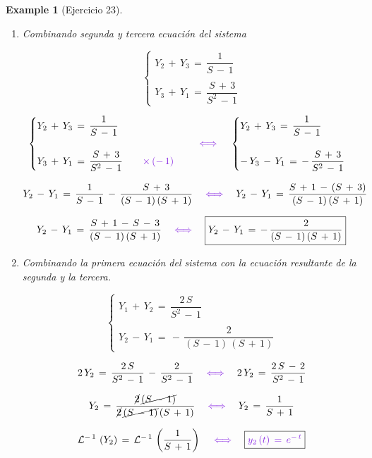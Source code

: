 \documentclass[a4paper,11pt,openany]{book}
\newtheorem{exmp}{Example}[section]
\newcommand*{\itembolasazules}[1]{%
\footnotesize\protect\tikz[baseline=-3pt]%
\protect\node[scale=.7, circle, shade, ball
color=green]{\color{white}\Large\bf#1};}
\begin{document}
\begin{exmp}[Ejercicio 23]
\begin{enumerate}[label=\itembolasazules{\arabic*}]
\item Combinando segunda y tercera ecuación del sistema
 
$$\begin{cases}
Y_{2}\,+\,Y_{3}\,=\,\dfrac{1}{S\,-\,1} \\
\\
Y_{3}\,+\,Y_{1}\,=\,\dfrac{S\,+\,3}{S^{2}\,-\,1}
\end{cases}$$
 
$$\begin{cases}
Y_{2}\,+\,Y_{3}\,=\,\dfrac{1}{S\,-\,1} \\
\\
Y_{3}\,+\,Y_{1}\,=\,\dfrac{S\,+\,3}{S^{2}\,-\,1} \qquad \textcolor{blue-violet}{\times\,(-\,1)}
\end{cases} \quad \textcolor{blue-violet}{\iff} \quad \begin{cases}
Y_{2}\,+\,Y_{3}\,=\,\dfrac{1}{S\,-\,1} \\
\\
-\,Y_{3}\,-\,Y_{1}\,=\,-\,\dfrac{S\,+\,3}{S^{2}\,-\,1} 
\end{cases}$$
 
$$Y_{2}\,-\,Y_{1}\,=\,\dfrac{1}{S\,-\,1}\,-\,\dfrac{S\,+\,3}{(S\,-\,1)\,(S\,+\,1)} \quad \textcolor{blue-violet}{\iff} \quad Y_{2}\,-\,Y_{1}\,=\,\dfrac{S\,+\,1\,-\,(S\,+\,3)}{(S\,-\,1)\,(S\,+\,1)}$$
 
$$Y_{2}\,-\,Y_{1}\,=\,\dfrac{S\,+\,1\,-\,S\,-\,3}{(S\,-\,1)\,(S\,+\,1)} \quad \textcolor{blue-violet}{\iff} \quad \boxed{Y_{2}\,-\,Y_{1}\,=\,-\,\dfrac{2}{(S\,-\,1)\,(S\,+\,1)} }$$
 
\item Combinando la primera ecuación del sistema con la ecuación resultante de la segunda y la tercera. 
 
$$\begin{cases}
Y_{1}\,+\,Y_{2}\,=\,\dfrac{2\,S}{S^{2}\,-\,1}\\
\\
Y_{2}\,-\,Y_{1}\,=\,-\,\dfrac{2}{(S\,-\,1)\,(S\,+\,1)}
\end{cases}$$
 
$$2\,Y_{2}\,=\,\dfrac{2\,S}{S^{2}\,-\,1}\,-\,\dfrac{2}{S^{2}\,-\,1} \quad \textcolor{blue-violet}{\iff} \quad 2\,Y_{2}\,=\,\dfrac{2\,S\,-\,2}{S^{2}\,-\,1}$$
 
$$Y_{2}\,=\,\dfrac{\cancel{2}\,\cancel{(S\,-\,1)}}{\cancel{2}\,\cancel{(S\,-\,1)}\,(S\,+\,1)} \quad \textcolor{blue-violet}{\iff} \quad Y_{2}\,=\,\dfrac{1}{S\,+\,1}$$
 
$$\mathcal{L}^{-\,1}\,\left(Y_{2} \right)\,=\,\mathcal{L}^{-\,1}\,\left(\dfrac{1}{S\,+\,1} \right) \quad \textcolor{blue-violet}{\iff} \quad \boxed{\textcolor{blue-violet}{y_{2}\,(t)\,=\,e^{-\,t} } }$$
 

\end{enumerate}
\end{exmp}
\end{document}
